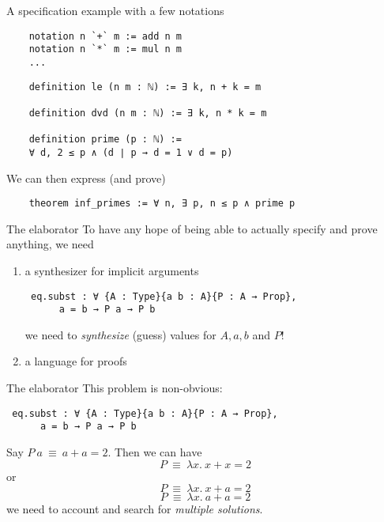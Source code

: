\documentclass{beamer}
\begin{document}
\begin{frame}[fragile]{A specification example}
  with a few notations
  \begin{lstlisting}
    notation n `+` m := add n m
    notation n `*` m := mul n m
    ...
  \end{lstlisting}
  \begin{lstlisting}
    definition le (n m : ℕ) := ∃ k, n + k = m
    
    definition dvd (n m : ℕ) := ∃ k, n * k = m
    
    definition prime (p : ℕ) :=
    ∀ d, 2 ≤ p ∧ (d ∣ p → d = 1 ∨ d = p)
  \end{lstlisting}
  We can then express (and prove)
  
  \begin{lstlisting}
    theorem inf_primes := ∀ n, ∃ p, n ≤ p ∧ prime p
  \end{lstlisting}
\end{frame}

\begin{frame}[fragile]{The elaborator}
  To have any hope of being able to actually specify and prove
  anything, we need
  \begin{enumerate}
  \item a synthesizer for implicit arguments
    \begin{lstlisting}
 eq.subst : ∀ {A : Type}{a b : A}{P : A → Prop},
      a = b → P a → P b
    \end{lstlisting}
    we need to \emph{synthesize} (guess) values for $A, a, b$ and $P$!
    
  \item a language for proofs
  \end{enumerate}
\end{frame}

\begin{frame}[fragile]{The elaborator}
  This problem is non-obvious:
    \begin{lstlisting}
 eq.subst : ∀ {A : Type}{a b : A}{P : A → Prop},
      a = b → P a → P b
    \end{lstlisting}

    Say $P\ a\ \equiv\ a + a = 2$. Then we can have
    \[P\ \equiv\ \lambda x.\ x+x = 2\]
    or
    \[P\ \equiv\ \lambda x.\ x+a = 2\]
    \[P\ \equiv\ \lambda x.\ a+a = 2\]
    we need to account and search for \emph{multiple solutions}.
\end{frame}
\end{document}
